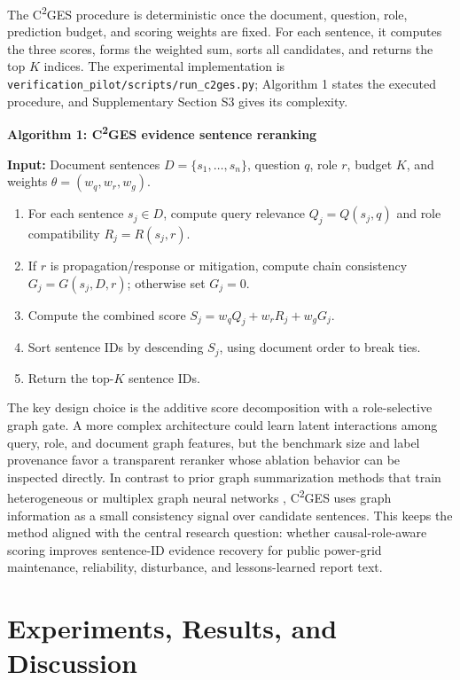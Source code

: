 \documentclass{article}
\begin{document}
The C\textsuperscript{2}GES procedure is deterministic once the document, question, role, prediction budget, and scoring weights are fixed. For each sentence, it computes the three scores, forms the weighted sum, sorts all candidates, and returns the top $K$ indices. The experimental implementation is \texttt{verification_pilot/scripts/run_c2ges.py}; Algorithm 1 states the executed procedure, and Supplementary Section S3 gives its complexity.

\textbf{Algorithm 1: C\textsuperscript{2}GES evidence sentence reranking}

\textbf{Input:} Document sentences $D=\{s_1,\ldots,s_n\}$, question $q$, role $r$, budget $K$, and weights $\theta=(w_q,w_r,w_g)$.

\begin{enumerate}
\item For each sentence $s_j \in D$, compute query relevance $Q_j=Q(s_j,q)$ and role compatibility $R_j=R(s_j,r)$.
\item If $r$ is propagation/response or mitigation, compute chain consistency $G_j=G(s_j,D,r)$; otherwise set $G_j=0$.
\item Compute the combined score $S_j=w_qQ_j+w_rR_j+w_gG_j$.
\item Sort sentence IDs by descending $S_j$, using document order to break ties.
\item Return the top-$K$ sentence IDs.
\end{enumerate}

The key design choice is the additive score decomposition with a role-selective graph gate. A more complex architecture could learn latent interactions among query, role, and document graph features, but the benchmark size and label provenance favor a transparent reranker whose ablation behavior can be inspected directly. In contrast to prior graph summarization methods that train heterogeneous or multiplex graph neural networks \cite{wang2020heterogeneous,jing2021multiplex}, C\textsuperscript{2}GES uses graph information as a small consistency signal over candidate sentences. This keeps the method aligned with the central research question: whether causal-role-aware scoring improves sentence-ID evidence recovery for public power-grid maintenance, reliability, disturbance, and lessons-learned report text.

\section{Experiments, Results, and Discussion}
\label{sec:experiments_results}
\end{document}
